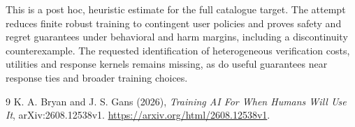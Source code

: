\documentclass[11pt]{article}
\theoremstyle{definition}
\begin{document}
This is a post hoc, heuristic estimate for the full catalogue target.
The attempt reduces finite robust training to contingent user policies and proves safety and regret guarantees under behavioral and harm margins, including a discontinuity counterexample. The requested identification of heterogeneous verification costs, utilities and response kernels remains missing, as do useful guarantees near response ties and broader training choices.

\begin{thebibliography}{9}
 K. A. Bryan and J. S. Gans (2026), \emph{Training AI For
When Humans Will Use It}, arXiv:2608.12538v1.
\url{https://arxiv.org/html/2608.12538v1}.
\end{thebibliography}
\end{document}
